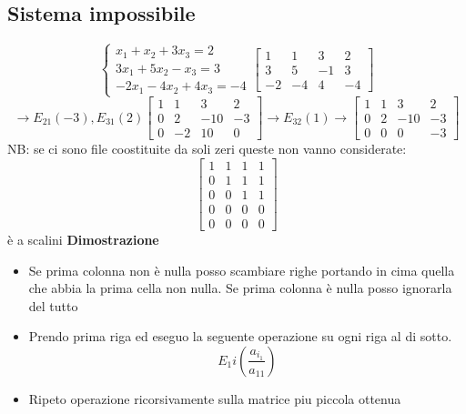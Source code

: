 \documentclass[12pt,a4paper,oneside]{article}
\begin{document}
\subsection{Sistema impossibile}
\[
	\begin{cases}
		x_1 + x_2 + 3x_3 = 2   \\
		3x_1 + 5 x_2 - x_3 = 3 \\
		-2x_1 - 4 x_2 + 4 x_3 = -4
	\end{cases}
	\begin{bmatrix}
		1  & 1  & 3  & 2  \\
		3  & 5  & -1 & 3  \\
		-2 & -4 & 4  & -4
	\end{bmatrix}
\]
\[
	\rightarrow E_{21}\left( -3 \right) , E_{31} \left( 2 \right)
	\begin{bmatrix}
		1 & 1  & 3   & 2  \\
		0 & 2  & -10 & -3 \\
		0 & -2 & 10  & 0
	\end{bmatrix}
	\rightarrow E_{32}\left( 1 \right)  \rightarrow
	\begin{bmatrix}
		1 & 1 & 3   & 2  \\
		0 & 2 & -10 & -3 \\
		0 & 0 & 0   & -3
	\end{bmatrix}
\]
NB: se ci sono file coostituite da soli zeri queste non vanno considerate:
\[
	\begin{bmatrix}
		1 & 1 & 1 & 1 \\
		0 & 1 & 1 & 1 \\
		0 & 0 & 1 & 1 \\
		0 & 0 & 0 & 0 \\
		0 & 0 & 0 & 0
	\end{bmatrix}
\]
è a scalini
\textbf{Dimostrazione}
\begin{itemize}
	\item Se prima colonna non è nulla posso scambiare righe portando in cima quella che abbia la prima cella non nulla. Se prima colonna è nulla posso ignorarla del tutto
	\item Prendo prima riga ed eseguo la seguente operazione su ogni riga al di sotto.
	      \[
		      E_1i \left( \frac{a_{i_1}}{a_{11}} \right)
	      \]
	\item Ripeto operazione ricorsivamente sulla matrice piu piccola ottenua
\end{itemize}
\end{document}
